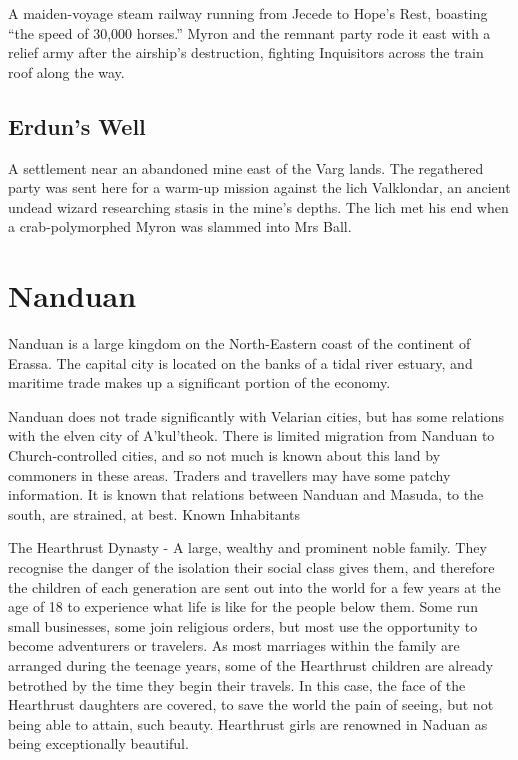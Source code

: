 A maiden-voyage steam railway running from Jecede to Hope's Rest, boasting ``the speed of 30,000 horses.''  Myron and the remnant party rode it east with a relief army after the airship's destruction, fighting Inquisitors across the train roof along the way.

\smallskip

\subsection*{Erdun's Well}

A settlement near an abandoned mine east of the Varg lands.  The regathered party was sent here for a warm-up mission against the lich Valklondar, an ancient undead wizard researching stasis in the mine's depths.  The lich met his end when a crab-polymorphed Myron was slammed into Mrs Ball.

\smallskip

\section{Nanduan} 

Nanduan is a large kingdom on the North-Eastern coast of the continent of Erassa. The capital city is located on the banks of a tidal river estuary, and maritime trade makes up a significant portion of the economy.

Nanduan does not trade significantly with Velarian cities, but has some relations with the elven city of A'kul'theok. There is limited migration from Nanduan to Church-controlled cities, and so not much is known about this land by commoners in these areas. Traders and travellers may have some patchy information. It is known that relations between Nanduan and Masuda, to the south, are strained, at best.
Known Inhabitants

    The Hearthrust Dynasty - A large, wealthy and prominent noble family. They recognise the danger of the isolation their social class gives them, and therefore the children of each generation are sent out into the world for a few years at the age of 18 to experience what life is like for the people below them. Some run small businesses, some join religious orders, but most use the opportunity to become adventurers or travelers. As most marriages within the family are arranged during the teenage years, some of the Hearthrust children are already betrothed by the time they begin their travels. In this case, the face of the Hearthrust daughters are covered, to save the world the pain of seeing, but not being able to attain, such beauty. Hearthrust girls are renowned in Naduan as being exceptionally beautiful.

